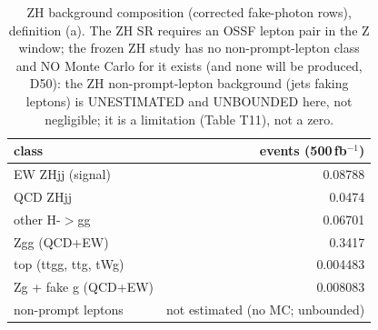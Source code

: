\begin{table}[ht]\centering\small
\begin{tabular}{lr}\hline
class & events (500\,fb$^{-1}$) \\\hline
EW ZHjj (signal) & 0.08788 \\
QCD ZHjj & 0.0474 \\
other H-$>$gg & 0.06701 \\
Zgg (QCD+EW) & 0.3417 \\
top (ttgg, ttg, tWg) & 0.004483 \\
Zg + fake g (QCD+EW) & 0.008083 \\
non-prompt leptons & not estimated (no MC; unbounded) \\\hline
\end{tabular}
\caption{ZH background composition (corrected fake-photon rows), definition (a). The ZH SR requires an OSSF lepton pair in the Z window; the frozen ZH study has no non-prompt-lepton class and NO Monte Carlo for it exists (and none will be produced, D50): the ZH non-prompt-lepton background (jets faking leptons) is UNESTIMATED and UNBOUNDED here, not negligible; it is a limitation (Table T11), not a zero.}
\end{table}
